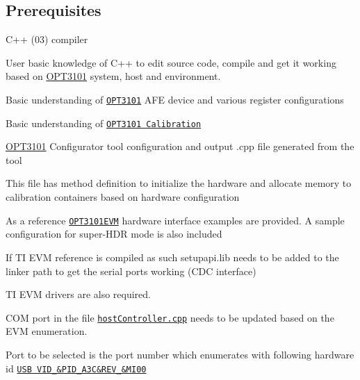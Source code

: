 \subsection*{\label{_Prereq}%
Prerequisites}


\begin{DoxyItemize}
\item C++ (03) compiler
\item User basic knowledge of C++ to edit source code, compile and get it working based on \mbox{\hyperlink{namespace_o_p_t3101}{O\+P\+T3101}} system, host and environment.
\item Basic understanding of \href{http://www.ti.com/product/OPT3101}{\tt O\+P\+T3101} A\+FE device and various register configurations
\item Basic understanding of \href{http://www.ti.com/lit/ug/sbau310/sbau310.pdf}{\tt O\+P\+T3101 Calibration}
\item \mbox{\hyperlink{namespace_o_p_t3101}{O\+P\+T3101}} Configurator tool configuration and output .cpp file generated from the tool
\begin{DoxyItemize}
\item This file has method definition to initialize the hardware and allocate memory to calibration containers based on hardware configuration
\end{DoxyItemize}
\item As a reference \href{http://www.ti.com/tool/OPT3101EVM}{\tt O\+P\+T3101\+E\+VM} hardware interface examples are provided. A sample configuration for super-\/\+H\+DR mode is also included
\begin{DoxyItemize}
\item If TI E\+VM reference is compiled as such setupapi.\+lib needs to be added to the linker path to get the serial ports working (C\+DC interface)
\item TI E\+VM drivers are also required.
\item C\+OM port in the file \href{host_controller_8cpp.html}{\tt host\+Controller.\+cpp} needs to be updated based on the E\+VM enumeration.
\item Port to be selected is the port number which enumerates with following hardware id \href{https://e2e.ti.com/cfs-file/__key/communityserver-discussions-components-files/989/8461.ControlPort.PNG}{\tt U\+SB V\+I\+D\+\_\&P\+I\+D\+\_\+A3C\&R\+E\+V\+\_\&M\+I00}
\end{DoxyItemize}
\end{DoxyItemize}





